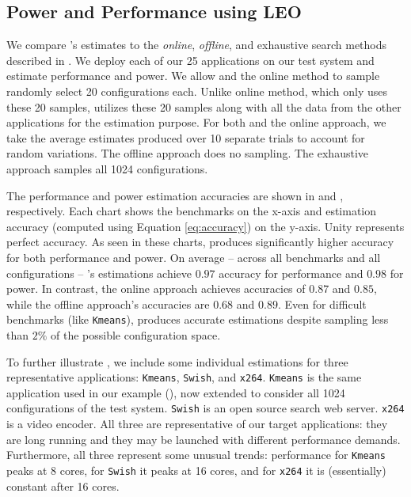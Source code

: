 \subsection{Power and Performance using LEO}
\label{sec:experiment:PP}
We compare \SYSTEMLEO{}'s estimates to the \emph{online}, \emph{offline},
and exhaustive search methods described in .  We deploy each of our 25 applications on our test
system and estimate performance and power.  We allow \SYSTEMLEO{} and the
online method to sample randomly select 20 configurations each. Unlike online method, which only uses these 20 samples, \SYSTEMLEO{} utilizes these 20 samples along with all the data from the other applications for the estimation purpose.  For
both \SYSTEMLEO{} and the online approach, we take the average estimates
produced over 10 separate trials to account for random variations.
The offline approach does no sampling.  The exhaustive approach
samples all 1024 configurations.

The performance and power estimation accuracies are shown in
 and , respectively.  Each
chart shows the benchmarks on the x-axis and estimation accuracy
(computed using Equation \ref{eq:accuracy}) on the y-axis.  Unity
represents perfect accuracy.  As seen in these charts, \SYSTEMLEO{}
produces significantly higher accuracy for both performance and power.
On average -- across all benchmarks and all configurations --
\SYSTEMLEO{}'s estimations achieve $0.97$ accuracy for performance and
$0.98$ for power.  In contrast, the online approach achieves
accuracies of $0.87$ and $0.85$, while the offline approach's
accuracies are $0.68$ and $0.89$.  Even for difficult benchmarks (like
\texttt{Kmeans}), \SYSTEMLEO{} produces accurate estimations despite
sampling less than $2\%$ of the possible configuration space.

To further illustrate \SYSTEMLEO{}, we include some individual
estimations for three representative applications: \texttt{Kmeans},
\texttt{Swish}, and \texttt{x264}.  \texttt{Kmeans} is the same
application used in our example (), now extended to
consider all 1024 configurations of the test system.  \texttt{Swish}
is an open source search web server. \texttt{x264} is a video encoder.
All three are representative of our target applications: they are long
running and they may be launched with different performance demands.
Furthermore, all three represent some unusual trends: performance for
\texttt{Kmeans} peaks at 8 cores, for \texttt{Swish} it peaks at 16
cores, and for \texttt{x264} it is (essentially) constant after 16
cores.

